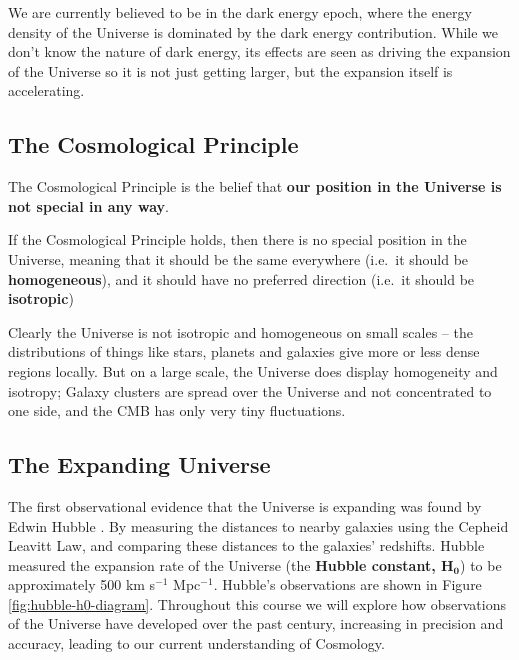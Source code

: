 \documentclass[11pt,a4paper,notoc]{tufte-handout}
\begin{document}
We are currently believed to be in the dark energy epoch, where the
energy density of the Universe is dominated by the dark energy
contribution. While we don't know the nature of dark energy, its effects
are seen as driving the expansion of the Universe so it is not just
getting larger, but the expansion itself is accelerating.

\hypertarget{sec:cosmoprinciple}{%
\subsection{The Cosmological Principle}\label{sec:cosmoprinciple}}

The Cosmological Principle is the belief that \textbf{our position in the
Universe is not special in any way}.

If the Cosmological Principle holds, then there is no special position
in the Universe, meaning that it should be the same everywhere (i.e.~it
should be \textbf{homogeneous}), and it should have no preferred direction
(i.e.~it should be \textbf{isotropic})

Clearly the Universe is not isotropic and homogeneous on small scales --
the distributions of things like stars, planets and galaxies give more
or less dense regions locally. But on a large scale, the Universe does
display homogeneity and isotropy; Galaxy clusters are spread over the
Universe and not concentrated to one side, and the CMB has only very
tiny fluctuations.

\hypertarget{sec:expanding_intro}{%
\subsection{The Expanding Universe}\label{sec:expanding_intro}}

The first observational evidence that the Universe is expanding was
found by Edwin Hubble \citep{1929Hubble}. By measuring the distances
to nearby galaxies using the Cepheid Leavitt Law, and comparing
these distances to the galaxies' redshifts. Hubble measured the
expansion rate of the Universe (the \textbf{Hubble constant, \(\mathbf{H_0}\)})
to be approximately 500 km s\(^{-1}\) Mpc\(^{-1}\). Hubble's observations
are shown in
Figure \ref{fig:hubble-h0-diagram}. Throughout this course we will
explore how observations of the Universe have developed over the past
century, increasing in precision and accuracy, leading to our current
understanding of Cosmology.
\end{document}
